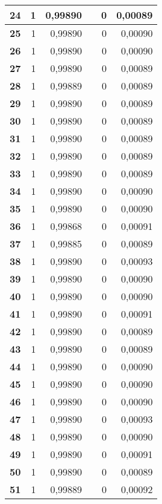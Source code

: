 {\begin{longtable}{|r|r|r|l|r|r|}
\textbf{24} & 1 & 0,99890 &  & 0 & 0,00089 \\ \hline
\textbf{25} & 1 & 0,99890 &  & 0 & 0,00090 \\ \hline
\textbf{26} & 1 & 0,99890 &  & 0 & 0,00090 \\ \hline
\textbf{27} & 1 & 0,99890 &  & 0 & 0,00089 \\ \hline
\textbf{28} & 1 & 0,99889 &  & 0 & 0,00089 \\ \hline
\textbf{29} & 1 & 0,99890 &  & 0 & 0,00089 \\ \hline
\textbf{30} & 1 & 0,99890 &  & 0 & 0,00089 \\ \hline
\textbf{31} & 1 & 0,99890 &  & 0 & 0,00089 \\ \hline
\textbf{32} & 1 & 0,99890 &  & 0 & 0,00089 \\ \hline
\textbf{33} & 1 & 0,99890 &  & 0 & 0,00089 \\ \hline
\textbf{34} & 1 & 0,99890 &  & 0 & 0,00090 \\ \hline
\textbf{35} & 1 & 0,99890 &  & 0 & 0,00090 \\ \hline
\textbf{36} & 1 & 0,99868 &  & 0 & 0,00091 \\ \hline
\textbf{37} & 1 & 0,99885 &  & 0 & 0,00089 \\ \hline
\textbf{38} & 1 & 0,99890 &  & 0 & 0,00093 \\ \hline
\textbf{39} & 1 & 0,99890 &  & 0 & 0,00090 \\ \hline
\textbf{40} & 1 & 0,99890 &  & 0 & 0,00090 \\ \hline
\textbf{41} & 1 & 0,99890 &  & 0 & 0,00091 \\ \hline
\textbf{42} & 1 & 0,99890 &  & 0 & 0,00089 \\ \hline
\textbf{43} & 1 & 0,99890 &  & 0 & 0,00089 \\ \hline
\textbf{44} & 1 & 0,99890 &  & 0 & 0,00090 \\ \hline
\textbf{45} & 1 & 0,99890 &  & 0 & 0,00090 \\ \hline
\textbf{46} & 1 & 0,99890 &  & 0 & 0,00090 \\ \hline
\textbf{47} & 1 & 0,99890 &  & 0 & 0,00093 \\ \hline
\textbf{48} & 1 & 0,99890 &  & 0 & 0,00090 \\ \hline
\textbf{49} & 1 & 0,99890 &  & 0 & 0,00091 \\ \hline
\textbf{50} & 1 & 0,99890 &  & 0 & 0,00089 \\ \hline
\textbf{51} & 1 & 0,99889 &  & 0 & 0,00092 \\ \hline

\end{longtable}}
